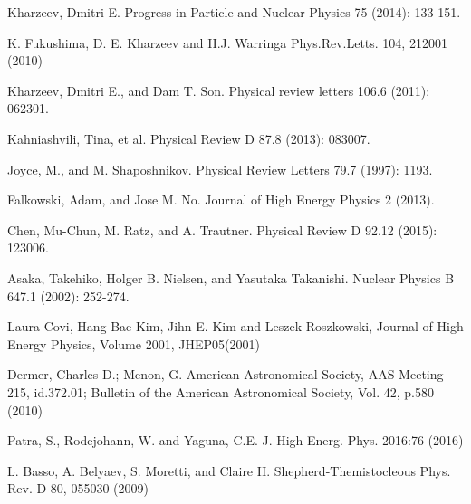 \documentclass{ws-mpla}
\begin{document}
\begin{thebibliography}{99}
Kharzeev, Dmitri E. 
Progress in Particle and Nuclear Physics 75 (2014): 133-151.

 K. Fukushima, D. E. Kharzeev and H.J. Warringa  
Phys.Rev.Letts. 104, 212001 (2010)

Kharzeev, Dmitri E., and Dam T. Son. 
Physical review letters 106.6 (2011): 062301.

Kahniashvili, Tina, et al. 
Physical Review D 87.8 (2013): 083007.

Joyce, M., and M. Shaposhnikov. 
Physical Review Letters 79.7 (1997): 1193.

	Falkowski, Adam, and Jose M. No. 
	Journal of High Energy Physics 2 (2013).



	Chen, Mu-Chun, M. Ratz, and A. Trautner. 
	Physical Review D 92.12 (2015): 123006.

Asaka, Takehiko, Holger B. Nielsen, and Yasutaka Takanishi.
	Nuclear Physics B 647.1 (2002): 252-274.

  Laura Covi, Hang Bae Kim, Jihn E. Kim and Leszek Roszkowski,
	 Journal of High Energy Physics, Volume 2001, JHEP05(2001)

  Dermer, Charles D.; Menon, G.
	 American Astronomical Society, AAS Meeting 215, id.372.01; Bulletin of the American Astronomical Society, Vol. 42, p.580 (2010)
	 
 Patra, S., Rodejohann, W. and Yaguna, C.E. 
J. High Energ. Phys. 2016:76 (2016)

L. Basso, A. Belyaev, S. Moretti, and Claire H. Shepherd-Themistocleous
Phys. Rev. D 80, 055030  (2009)


\end{thebibliography}
\end{document}
